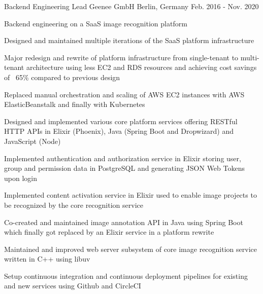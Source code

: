 

\begin{cventries}

  \cventry
    {Backend Engineering Lead} %
    {Geenee GmbH} %
    {Berlin, Germany} %
    {Feb. 2016 - Nov. 2020} %
    {
      \begin{cvitems} %
        \item {Backend engineering on a SaaS image recognition platform}
        \item {Designed and maintained multiple iterations of the SaaS platform infrastructure}
        \begin{cvsubitems}
          \item {Major redesign and rewrite of platform infrastructure from single-tenant to multi-tenant architecture using less EC2 and RDS resources and achieving cost savings of ~65\% compared to previous design}
          \item {Replaced manual orchestration and scaling of AWS EC2 instances with AWS ElasticBeanstalk and finally with Kubernetes}
        \end{cvsubitems}
        \item {Designed and implemented various core platform services offering RESTful HTTP APIs in Elixir (Phoenix), Java (Spring Boot and Dropwizard) and JavaScript (Node)}
        \begin{cvsubitems}
          \item {Implemented authentication and authorization service in Elixir storing user, group and permission data in PostgreSQL and generating JSON Web Tokens upon login}
          \item {Implemented content activation service in Elixir used to enable image projects to be recognized by the core recognition service}
          \item {Co-created and maintained image annotation API in Java using Spring Boot which finally got replaced by an Elixir service in a platform rewrite}
        \end{cvsubitems}
        \item {Maintained and improved web server subsystem of core image recognition service written in C++ using libuv}
        \item {Setup continuous integration and continuous deployment pipelines for existing and new services using Github and CircleCI}
      \end{cvitems}
    }


\end{cventries}
